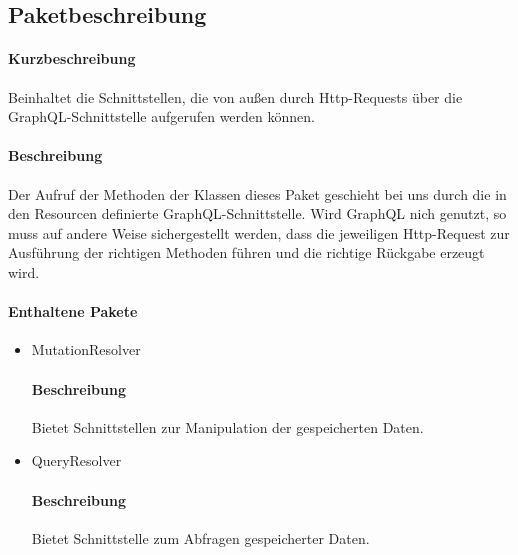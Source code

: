 \subsection*{Paketbeschreibung}%
\paragraph*{Kurzbeschreibung}
Beinhaltet die Schnittstellen, die von außen durch Http-Requests über die GraphQL-Schnittstelle aufgerufen werden können.
\paragraph*{Beschreibung}
Der Aufruf der Methoden der Klassen dieses Paket geschieht bei uns durch die in den Resourcen definierte GraphQL-Schnittstelle.
Wird GraphQL nich genutzt, so muss auf andere Weise sichergestellt werden, dass die jeweiligen Http-Request zur Ausführung der richtigen Methoden
führen und die richtige Rückgabe erzeugt wird.
\paragraph*{Enthaltene Pakete}
\begin{itemize}
    \item MutationResolver
    		\paragraph*{Beschreibung}
            Bietet Schnittstellen zur Manipulation der gespeicherten Daten.
    \item QueryResolver
    		\paragraph*{Beschreibung}
    		Bietet Schnittstelle zum Abfragen gespeicherter Daten.
\end{itemize}

